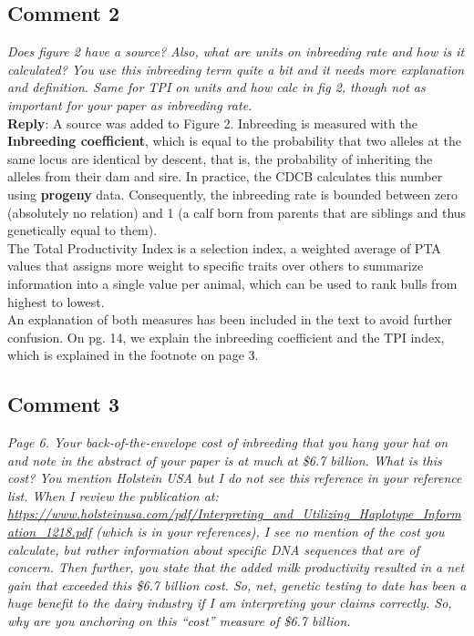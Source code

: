 \documentclass[12pt,letterpaper]{article}
\begin{document}
\subsection*{Comment 2}
{\it Does figure 2 have a source?  Also, what are units on inbreeding rate and how is it calculated? You use this inbreeding term quite a bit and it needs more explanation and definition. Same for TPI on units and how calc in fig 2, though not as important for your paper as inbreeding rate. } \\

\textbf{Reply}: A source was added to Figure 2. Inbreeding is measured with the \textbf{Inbreeding coefficient}, which is equal to the probability that two alleles at the same locus are identical by descent, that is, the probability of inheriting the alleles from their dam and sire. In practice, the CDCB calculates this number using \textbf{progeny} data. Consequently, the inbreeding rate is bounded between zero (absolutely no relation) and 1 (a calf born from parents that are siblings and thus genetically equal to them). \\

The Total Productivity Index is a selection index, a weighted average of PTA values that assigns more weight to specific traits over others to summarize information into a single value per animal, which can be used to rank bulls from highest to lowest. \\

An explanation of both measures has been included in the text to avoid further confusion.
On pg. 14, we explain the inbreeding coefficient and the TPI index, which is explained in the footnote on page 3. \\


\subsection*{Comment 3}
{\it Page 6.  Your back-of-the-envelope cost of inbreeding that you hang your hat on and note in the abstract of your paper is at much at \$6.7 billion. What is this cost? You mention Holstein USA but I do not see this reference in your reference list. When I review the publication at:  \url{https://www.holsteinusa.com/pdf/Interpreting_and_Utilizing_Haplotype_Information_1218.pdf} (which is in your references), I see no mention of the cost you calculate, but rather information about specific DNA sequences that are of concern. Then further, you state that the added milk productivity resulted in a net gain that exceeded this \$6.7 billion cost. So, net, genetic testing to date has been a huge benefit to the dairy industry if I am interpreting your claims correctly. So, why are you anchoring on this “cost” measure of \$6.7 billion.} \\
\end{document}
